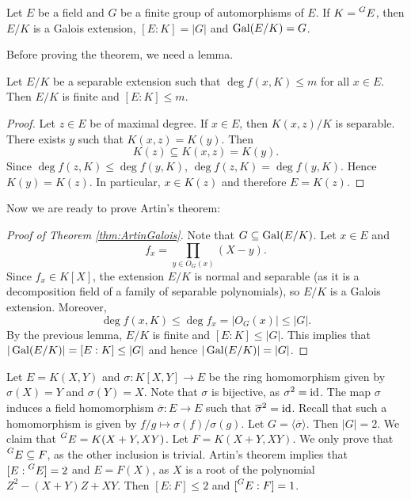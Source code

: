 \begin{theorem}[Artin]
\label{thm:ArtinGalois}
    Let $E$ be a field and $G$ be a finite group of automorphisms of $E$. 
    If $K=\prescript{G}{}{E}$, then $E/K$ is a Galois extension,
    $[E:K]=|G|$ and $\operatorname{Gal}(E/K)=G$. 
\end{theorem}

Before proving the theorem, we need a lemma.

\begin{lemma}
    Let $E/K$ be a separable extension such that $\deg f(x,K)\leq m$
    for all $x\in E$. Then $E/K$ is finite and $[E:K]\leq m$. 
\end{lemma}

\begin{proof}
   Let $z\in E$ be of maximal degree. If $x\in E$, 
   then $K(x,z)/K$ is separable. There exists $y$ such that $K(x,z)=K(y)$. Then 
   \[
   K(z)\subseteq K(x,z)=K(y).
   \]
   Since 
   $\deg f(z,K)\leq\deg f(y,K)$, 
   $\deg f(z,K)=\deg f(y,K)$. Hence 
   $K(y)=K(z)$. In particular, $x\in K(z)$ and
   therefore $E=K(z)$. 
\end{proof}

Now we are ready to prove Artin's theorem: 

\begin{proof}[Proof of Theorem \ref{thm:ArtinGalois}]
    Note that $G\subseteq\operatorname{Gal}(E/K)$. Let $x\in E$ and 
    \[
    f_x=\prod_{y\in O_G(x)}(X-y).
    \]
    Since $f_x\in K[X]$, the extension $E/K$ is normal and separable (as it is a decomposition
    field of a family of separable polynomials), so $E/K$ is a Galois extension. Moreover, 
    \[
    \deg f(x,K)\leq \deg f_x=|O_G(x)|\leq |G|.
    \]
    By the previous lemma, $E/K$ is finite and $[E:K]\leq |G|$. This
    implies that
    $|\operatorname{Gal}(E/K)|=[E:K]\leq |G|$ and hence $|\operatorname{Gal}(E/K)|=|G|$. 
\end{proof}

\begin{example}
    Let $E=K(X,Y)$ and $\sigma\colon K[X,Y]\to E$ be the ring homomorphism given by $\sigma(X)=Y$ and $\sigma(Y)=X$. Note that $\sigma$ is bijective, as $\sigma^2=\operatorname{id}$. The map $\sigma$ induces
    a field homomorphism $\overline{\sigma}\colon E\to E$ such that 
    $\overline{\sigma}^2=\operatorname{id}$. Recall that such a homomorphism is given by 
    $f/g\mapsto \sigma(f)/\sigma(g)$. Let $G=\langle\overline{\sigma}\rangle$. Then $|G|=2$. 
    We claim that $\prescript{G}{}{E}=K(X+Y,XY)$. Let $F=K(X+Y,XY)$. We only prove
    that $\prescript{G}{}{E}\subseteq F$, as the other inclusion is trivial. Artin's theorem
    implies that $[E:\prescript{G}{}{E}]=2$ and $E=F(X)$, as $X$ is a root
    of the polynomial $Z^2-(X+Y)Z+XY$. Then $[E:F]\leq 2$ and $[\prescript{G}{}{E}:F]=1$.
\end{example}
